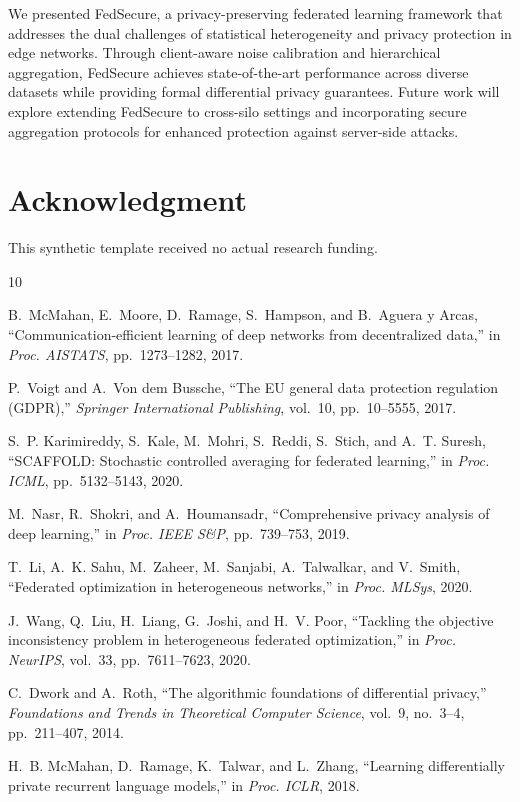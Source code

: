 \documentclass[conference]{IEEEtran}
\begin{document}
We presented FedSecure, a privacy-preserving federated learning framework that addresses the dual challenges of statistical heterogeneity and privacy protection in edge networks. Through client-aware noise calibration and hierarchical aggregation, FedSecure achieves state-of-the-art performance across diverse datasets while providing formal differential privacy guarantees. Future work will explore extending FedSecure to cross-silo settings and incorporating secure aggregation protocols for enhanced protection against server-side attacks.

\section*{Acknowledgment}

This synthetic template received no actual research funding.

\begin{thebibliography}{10}

B.~McMahan, E.~Moore, D.~Ramage, S.~Hampson, and B.~Aguera y Arcas, ``Communication-efficient learning of deep networks from decentralized data,'' in \textit{Proc. AISTATS}, pp.~1273--1282, 2017.

P.~Voigt and A.~Von dem Bussche, ``The {EU} general data protection regulation ({GDPR}),'' \textit{Springer International Publishing}, vol.~10, pp.~10--5555, 2017.

S.~P. Karimireddy, S.~Kale, M.~Mohri, S.~Reddi, S.~Stich, and A.~T. Suresh, ``{SCAFFOLD}: Stochastic controlled averaging for federated learning,'' in \textit{Proc. ICML}, pp.~5132--5143, 2020.

M.~Nasr, R.~Shokri, and A.~Houmansadr, ``Comprehensive privacy analysis of deep learning,'' in \textit{Proc. IEEE S\&P}, pp.~739--753, 2019.

T.~Li, A.~K. Sahu, M.~Zaheer, M.~Sanjabi, A.~Talwalkar, and V.~Smith, ``Federated optimization in heterogeneous networks,'' in \textit{Proc. MLSys}, 2020.

J.~Wang, Q.~Liu, H.~Liang, G.~Joshi, and H.~V. Poor, ``Tackling the objective inconsistency problem in heterogeneous federated optimization,'' in \textit{Proc. NeurIPS}, vol.~33, pp.~7611--7623, 2020.

C.~Dwork and A.~Roth, ``The algorithmic foundations of differential privacy,'' \textit{Foundations and Trends in Theoretical Computer Science}, vol.~9, no.~3--4, pp.~211--407, 2014.

H.~B. McMahan, D.~Ramage, K.~Talwar, and L.~Zhang, ``Learning differentially private recurrent language models,'' in \textit{Proc. ICLR}, 2018.

\end{thebibliography}
\end{document}
